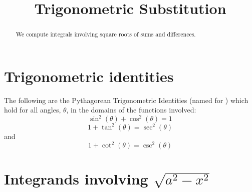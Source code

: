 \documentclass{ximera}
\title{Trigonometric Substitution}
\begin{document}
\begin{abstract}
We compute integrals involving square roots of sums and differences.
\end{abstract}

\maketitle

\section{Trigonometric identities}

The following are the Pythagorean Trigonometric Identities 
(named for ) 
which hold for all angles,
$\theta$, in the domains of the functions involved:
\[
\sin^2(\theta) + \cos^2(\theta) = 1
\]
\[
1 + \tan^2(\theta) = \sec^2(\theta)
\]
and
\[
1 + \cot^2(\theta) = \csc^2(\theta)
\]



\section{Integrands involving $\sqrt{a^2 - x^2}$}
\end{document}
